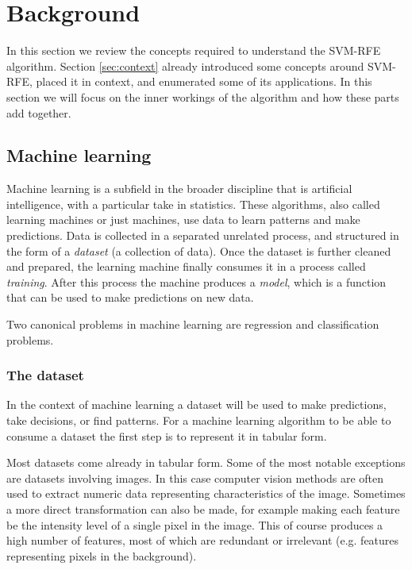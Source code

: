 \chapter{Background}
\label{Chapter4}

In this section we review the concepts required to understand the SVM-RFE al\-go\-rithm. Section \ref{sec:context} already introduced some concepts around SVM-RFE, placed it in context, and enumerated some of its applications. In this section we will focus on the inner workings of the algorithm and how these parts add together. 

\section{Machine learning}

Machine learning is a subfield in the broader discipline that is artificial intelligence, with a particular take in statistics. These algorithms, also called learning machines or just machines, use data to learn patterns and make predictions. Data is collected in a separated unrelated process, and structured in the form of a \emph{dataset} (a collection of data). Once the dataset is further cleaned and prepared, the learning machine finally consumes it in a process called \emph{training}. After this process the machine pro\-duces a \emph{model}, which is a function that can be used to make predictions on new data.

Two canonical problems in machine learning are regression and classification problems.

\subsection{The dataset}

In the context of machine learning a dataset will be used to make predictions, take decisions, or find patterns. For a machine learning algorithm to be able to consume a dataset the first step is to represent it in tabular form. 

Most datasets come already in tabular form. Some of the most notable ex\-cep\-tions are datasets involving images. In this case computer vision methods are often used to extract numeric data representing characteristics of the image. Sometimes a more direct transformation can also be made, for example making each feature be the intensity level of a single pixel in the image. This of course produces a high number of features, most of which are redundant or irrelevant (e.g. features representing pixels in the background). 


